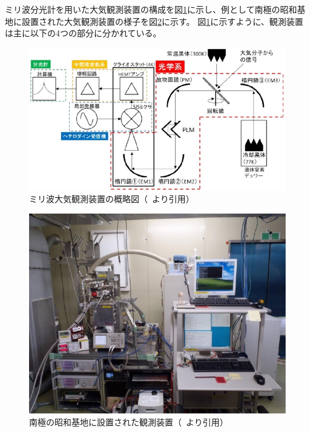 ミリ波分光計を用いた大気観測装置の構成を図\ref{fig:mm_component}に示し、例として南極の昭和基地に設置された大気観測装置の様子を図\ref{fig:mmobs_spectrometer_syowa}に示す。
図\ref{fig:mm_component}に示すように、観測装置は主に以下の4つの部分に分かれている。
\begin{figure}[htbp]
    \centering
    \includegraphics[width=\linewidth]{master_thesis_contents/master_thesis_fig/mm_component.pdf}
    \caption{ミリ波大気観測装置の概略図（~\cite{ito2017master}より引用）}
    \label{fig:mm_component}
\end{figure}
\begin{figure}[htbp]
    \centering
    \includegraphics[width=\linewidth]{master_thesis_contents/master_thesis_fig/mmobs_spectrometer_syowa.pdf}
    \caption{南極の昭和基地に設置された観測装置（~\cite{uemura2014master}より引用）}
    \label{fig:mmobs_spectrometer_syowa}
\end{figure}
